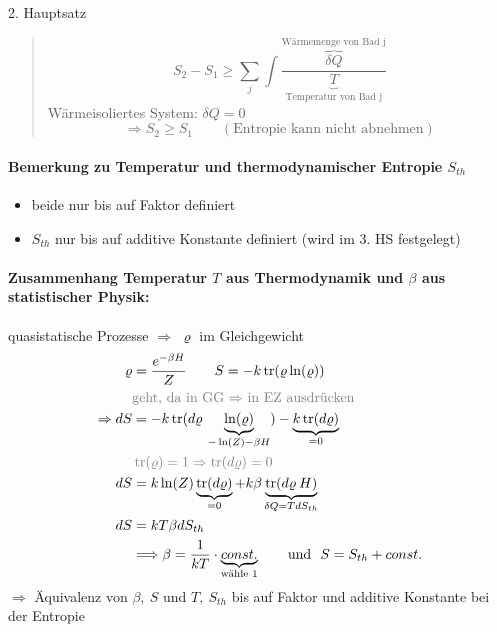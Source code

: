 \begin{definition}{2. Hauptsatz}
\begin{itemize}
\begin{quote}
            \begin{equation}
                S_2 - S_1 \geq \sum_j \int \frac{\overbrace{\delta Q}^{\text{Wärmemenge von Bad j}}}{\underbrace{T}_{\text{Temperatur von Bad j}}}
            \end{equation}
            Wärmeisoliertes System: $\delta Q = 0$
            \begin{equation}
                \Rightarrow S_2 \geq S_1 \qquad (\text{Entropie kann nicht abnehmen})
            \end{equation}
        \end{quote}
    \end{itemize}
\end{definition}

\paragraph{Bemerkung zu Temperatur und thermodynamischer Entropie $S_{th}$}
\begin{itemize}
    \item beide nur bis auf Faktor definiert
    \item $S_{th}$ nur bis auf additive Konstante definiert (wird im 3. HS festgelegt)
\end{itemize}

\paragraph{Zusammenhang Temperatur $T$ aus Thermodynamik und $\beta$ aus statistischer Physik:}
quasistatische Prozesse $\Longrightarrow$ $\varrho$ im Gleichgewicht
\begin{align}
    \varrho &= \frac{e^{-\beta H}}{Z} \qquad S = - k \trace(\varrho \ln(\varrho)) \\
    &\text{\color{black!50} geht, da in GG $\Rightarrow$ in EZ ausdrücken} \\
    \Rightarrow dS &= - k \trace(d\varrho \: \underbrace{\ln(\varrho)}_{-\ln(Z) - \beta H}) - \underbrace{ k \trace(d\varrho)}_{=0} \\
    &\color{black!50} \trace(\varrho) = 1 \Rightarrow \trace(d\varrho) = 0\\
    dS &= k \ln(Z) \underbrace{\trace(d\varrho)}_{=0} + k \beta \underbrace{\trace(d\varrho \: H)}_{\delta Q = T dS_{th}} \\
    dS &= k T \beta dS_{th} \\
    &\Longrightarrow \beta = \frac{1}{kT} \cdot \underbrace{const.}_{\text{wähle 1}} \qquad \text{und } \ S = S_{th} + const.
\end{align}
$\Longrightarrow$ Äquivalenz von $\beta, \ S$ und $T, \ S_{th}$ bis auf Faktor und additive Konstante bei der Entropie

